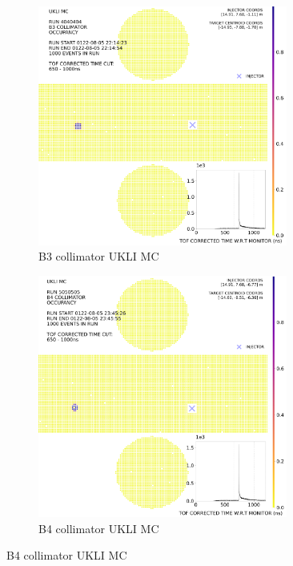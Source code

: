 \begin{figure}[htp]
    \medskip
    
    \begin{subfigure}{0.49\columnwidth}
    \centering
    \includegraphics[width=0.9\textwidth]{Figures/ukli_mc_B3.PNG}
    \caption{B3 collimator UKLI MC}
    \label{fig:time3}
    \end{subfigure}\hfill
    \begin{subfigure}{0.49\columnwidth}
    \centering
    \includegraphics[width=0.9\textwidth]{Figures/ukli_mc_B4.PNG}
    \caption{B4 collimator UKLI MC}
    \label{fig:time4}
    \end{subfigure}
    

\end{figure}
